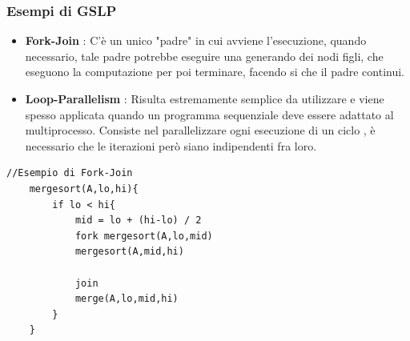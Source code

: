 \documentclass[10pt, letterpaper]{report}
\begin{document}
\subsubsection{Esempi di GSLP}\begin{itemize}
    \item \textbf{Fork-Join} : C'è un unico "padre" in cui avviene l'esecuzione, quando necessario, 
    tale padre potrebbe eseguire una  generando dei nodi figli, che eseguono la computazione 
    per poi terminare, facendo si che il padre continui.
    \item \textbf{Loop-Parallelism} : Risulta estremamente semplice da utilizzare e viene spesso applicata 
    quando un programma sequenziale deve essere adattato al multiprocesso. Consiste nel parallelizzare ogni 
    esecuzione di un ciclo , è necessario che le iterazioni però siano indipendenti fra loro.
\end{itemize}
\begin{lstlisting}[style=CStyle]
    //Esempio di Fork-Join
    mergesort(A,lo,hi){
        if lo < hi{
            mid = lo + (hi-lo) / 2 
            fork mergesort(A,lo,mid)
            mergesort(A,mid,hi)

            join 
            merge(A,lo,mid,hi)
        }
    }
\end{lstlisting}
\flowerLine 
\end{document}
